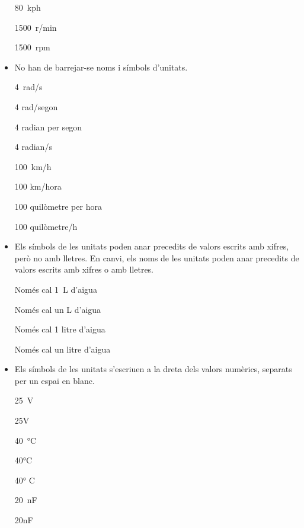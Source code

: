 \begin{itemize}
\textcolor{Red}\faTimesCircle{} \qty{80}{kph}

\textcolor{Green}\faCheckSquare{} \qty{1500}{r/min}

\textcolor{Red}\faTimesCircle{} \qty{1500}{rpm}
	

\item No han de barrejar-se noms i símbols d'unitats.

\textcolor{Green}\faCheckSquare{} \qty{4}{rad/s}

\textcolor{Red}\faTimesCircle{} 4 rad/segon

\textcolor{Green}\faCheckSquare{} 4 radian per segon

\textcolor{Red}\faTimesCircle{} 4 radian/s

\textcolor{Green}\faCheckSquare{} \qty{100}{km/h}

\textcolor{Red}\faTimesCircle{} 100 km/hora

\textcolor{Green}\faCheckSquare{} 100 quilòmetre per hora

\textcolor{Red}\faTimesCircle{} 100 quilòmetre/h


\item Els símbols de les unitats  poden anar precedits de valors escrits amb xifres, però no amb lletres. En canvi, els noms de les unitats poden anar precedits de valors escrits amb xifres o amb lletres. 

\textcolor{Green}\faCheckSquare{} Només cal \qty{1}{L} d'aigua

\textcolor{Red}\faTimesCircle{} Només cal un L d'aigua

\textcolor{Green}\faCheckSquare{} Només cal 1 litre d'aigua

\textcolor{Green}\faCheckSquare{} Només cal un litre d'aigua



\item Els símbols de les unitats s'escriuen a la dreta dels valors
numèrics, separats per un espai en blanc.

\textcolor{Green}\faCheckSquare{} \qty{25}{V}

\textcolor{Red}\faTimesCircle{} 25V

\textcolor{Green}\faCheckSquare{} \qty{40}{\degreeCelsius}

\textcolor{Red}\faTimesCircle{} 40\unit{\degreeCelsius}

\textcolor{Red}\faTimesCircle{} 40\unit{\degree} C

\textcolor{Green}\faCheckSquare{} \qty{20}{nF}

\textcolor{Red}\faTimesCircle{} 20nF



\end{itemize}
